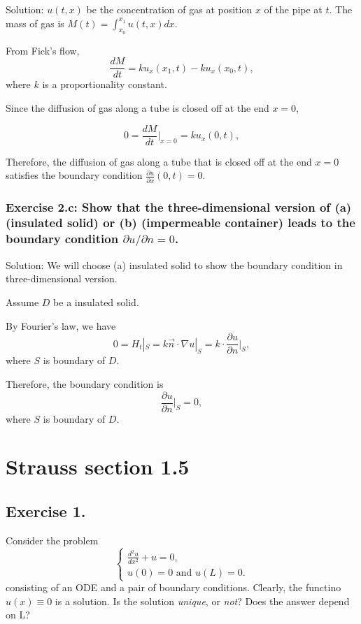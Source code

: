 \documentclass{article}
\begin{document}
		Solution: $u(t,x)$ be the concentration of gas at position $x$ of the pipe at $t$.
        The mass of gas is $M(t)= \int_{x_0}^{x_1} u(t,x)dx$.
		
		From Fick's flow, 
        \[ \frac{dM}{dt}=ku_{x}(x_{1},t)- ku_{x}(x_{0},t),\]
		where $k$ is a proportionality constant.

		Since the diffusion of gas along a tube is closed off at the end $x=0$,

       \[0= \frac{dM}{dt}|_ {x=0}= ku_{x}(0,t),\]

	   Therefore, the diffusion of gas along a tube that is closed off at the end $x=0$ satisfies the boundary condition $ \frac{\partial u}{\partial x}(0,t)=0.$

	   \subsubsection{Exercise 2.c:  Show that the three-dimensional version of (a) (insulated solid) or (b) (impermeable container) leads to the boundary condition $\partial u/ \partial n=0$.}
		
		Solution: We will choose (a) insulated solid to show the boundary condition in three-dimensional version.
	    
		Assume $D$ be a insulated solid.
		 
		By Fourier's law, we have 
		 \[0= H_{t}|_{S}= k\vec{n}\cdot \nabla u |_{S}=k\cdot \frac{\partial u}{\partial n}|_{S}, \]
        where $S$ is boundary of $D$.

		Therefore, the boundary condition is \[ \frac{\partial u}{\partial n}|_{S}=0,\]
		where $S$ is boundary of $D$.

\section{Strauss section 1.5}
\subsection{ Exercise 1.}
Consider the problem
		\begin{equation*}
			\begin{cases}
				\frac{d^2u}{dx^2}+u = 0,
				\\
				u(0)=0 \text{ and } u(L)=0.
			\end{cases}
		\end{equation*}
		consisting of an ODE and a pair of boundary
		conditions. Clearly, the functino $u(x) \equiv 0$ is a
		solution. Is the solution \textit{unique}, or \textit{not}?
	Does the answer depend on L?
\end{document}
